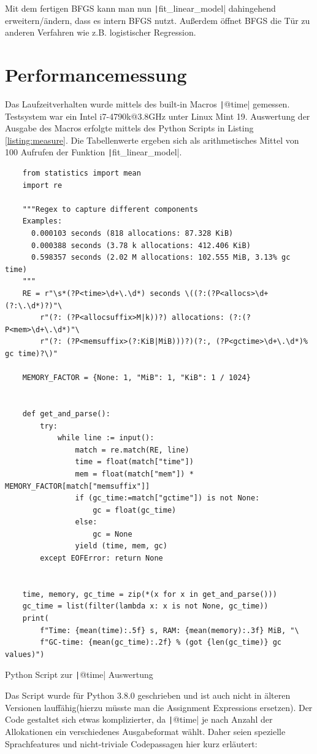\documentclass{article}
\theoremstyle{plain} %
\theoremstyle{definition} %
\begin{document}
Mit dem fertigen BFGS kann man nun \texttt|fit_linear_model| dahingehend erweitern/ändern, dass es intern BFGS nutzt. Außerdem öffnet BFGS die Tür zu anderen Verfahren wie z.B. logistischer Regression.

\newpage

\appendix

\section{Performancemessung}\label{appendix:measure}

Das Laufzeitverhalten wurde mittels des built-in Macros \texttt|@time| gemessen. Testsystem war ein Intel i7-4790k@3.8GHz unter Linux Mint 19. Auswertung der Ausgabe des Macros erfolgte mittels des Python Scripts in Listing \ref{listing:measure}. Die Tabellenwerte ergeben sich als arithmetisches Mittel von 100 Aufrufen der Funktion \texttt|fit_linear_model|.

\begin{listing}[H]
  \begin{verbatim}
    from statistics import mean
    import re
    
    """Regex to capture different components
    Examples:
      0.000103 seconds (818 allocations: 87.328 KiB)
      0.000388 seconds (3.78 k allocations: 412.406 KiB)
      0.598357 seconds (2.02 M allocations: 102.555 MiB, 3.13% gc time)
    """
    RE = r"\s*(?P<time>\d+\.\d*) seconds \((?:(?P<allocs>\d+(?:\.\d*)?)"\
        r"(?: (?P<allocsuffix>M|k))?) allocations: (?:(?P<mem>\d+\.\d*)"\
        r"(?: (?P<memsuffix>(?:KiB|MiB)))?)(?:, (?P<gctime>\d+\.\d*)% gc time)?\)"
    
    MEMORY_FACTOR = {None: 1, "MiB": 1, "KiB": 1 / 1024}
    

    def get_and_parse():
        try:
            while line := input():
                match = re.match(RE, line)
                time = float(match["time"])
                mem = float(match["mem"]) * MEMORY_FACTOR[match["memsuffix"]]
                if (gc_time:=match["gctime"]) is not None:
                    gc = float(gc_time)
                else:
                    gc = None
                yield (time, mem, gc)
        except EOFError: return None
    

    time, memory, gc_time = zip(*(x for x in get_and_parse()))
    gc_time = list(filter(lambda x: x is not None, gc_time))
    print(
        f"Time: {mean(time):.5f} s, RAM: {mean(memory):.3f} MiB, "\
        f"GC-time: {mean(gc_time):.2f} % (got {len(gc_time)} gc values)")

  \end{verbatim}
  \caption{Python Script zur \texttt|@time| Auswertung}
  \label{listing:measure}
\end{listing}
Das Script wurde für Python 3.8.0 geschrieben und ist auch nicht in älteren Versionen lauffähig(hierzu müsste man die Assignment Expressions ersetzen). Der Code gestaltet sich etwas komplizierter, da \texttt|@time| je nach Anzahl der Allokationen ein verschiedenes Ausgabeformat wählt. Daher seien spezielle Sprachfeatures und nicht-triviale Codepassagen hier kurz erläutert:
\end{document}
